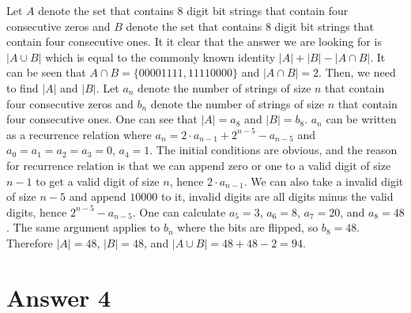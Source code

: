 \documentclass[12pt]{article}
\newcommand{\+}{\mkern2mu}
\begin{document}
Let $A$ denote the set that contains 8 digit bit strings that contain four consecutive zeros and $B$ denote the set that contains 8 digit bit strings that contain four consecutive ones. It it clear that the answer we are looking for is $|A \cup B|$ which is equal to the commonly known identity $|A| + |B| - |A \cap B|$. It can be seen that $A \cap B = \{00001111, 11110000\}$ and $|A \cap B| = 2$. Then, we need to find $|A|$ and $|B|$.
\newline
Let $a_n$ denote the number of strings of size $n$ that contain four consecutive zeros and $b_n$ denote the number of strings of size $n$ that contain four consecutive ones. One can see that $|A| = a_8$ and $|B| = b_8$.
\newline
$a_n$ can be written as a recurrence relation where $a_n = 2 \cdot a_{n-1} + 2^{n-5} - a_{n-5}$ and $a_0 = a_1 = a_2 = a_3 = 0$, $a_4 = 1$. The initial conditions are obvious, and the reason for recurrence relation is that we can append zero or one to a valid digit of size $n - 1$ to get a valid digit of size $n$, hence $2 \cdot a_{n-1}$. We can also take a invalid digit of size $n - 5$ and append $10000$ to it, invalid digits are all digits minus the valid digits, hence $2^{n-5} - a_{n-5}$. One can calculate $a_5 = 3$, $a_6 = 8$, $a_7 = 20$, and $a_8 = 48$.
\newline
The same argument applies to $b_n$ where the bits are flipped, so $b_8 = 48$. Therefore $|A| = 48$, $|B| = 48$, and $|A \cup B| = 48 + 48 - 2 = 94$.

\section*{Answer 4}
\end{document}
